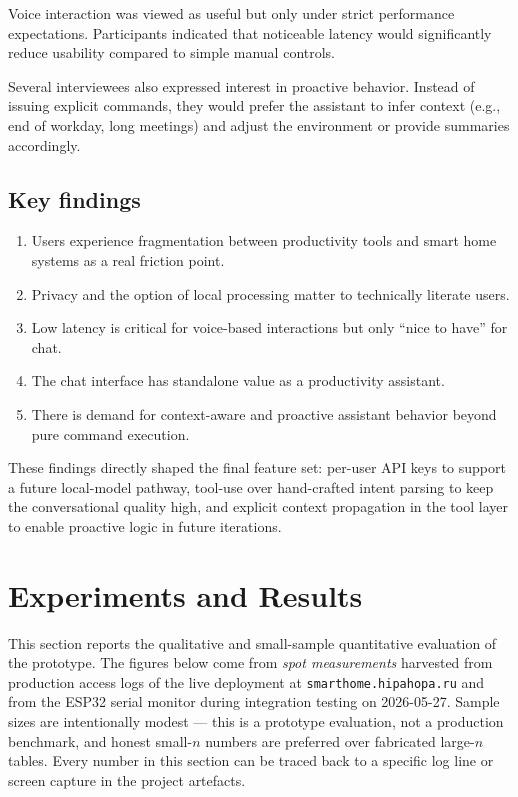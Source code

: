 \documentclass[a4paper,12pt]{article}
\begin{document}
Voice interaction was viewed as useful but only under strict performance expectations. Participants indicated that noticeable latency would significantly reduce usability compared to simple manual controls.

Several interviewees also expressed interest in proactive behavior. Instead of issuing explicit commands, they would prefer the assistant to infer context (e.g., end of workday, long meetings) and adjust the environment or provide summaries accordingly.

\subsection{Key findings}

\begin{enumerate}
  \item Users experience fragmentation between productivity tools and smart home systems as a real friction point.
  \item Privacy and the option of local processing matter to technically literate users.
  \item Low latency is critical for voice-based interactions but only ``nice to have'' for chat.
  \item The chat interface has standalone value as a productivity assistant.
  \item There is demand for context-aware and proactive assistant behavior beyond pure command execution.
\end{enumerate}

These findings directly shaped the final feature set: per-user API keys to support a future local-model pathway, tool-use over hand-crafted intent parsing to keep the conversational quality high, and explicit context propagation in the tool layer to enable proactive logic in future iterations.

\newpage

\section{Experiments and Results}
\label{sec:exp}

This section reports the qualitative and small-sample quantitative evaluation of the prototype. The figures below come from \emph{spot measurements} harvested from production access logs of the live deployment at \verb|smarthome.hipahopa.ru| and from the ESP32 serial monitor during integration testing on 2026-05-27. Sample sizes are intentionally modest --- this is a prototype evaluation, not a production benchmark, and honest small-$n$ numbers are preferred over fabricated large-$n$ tables. Every number in this section can be traced back to a specific log line or screen capture in the project artefacts.
\end{document}
